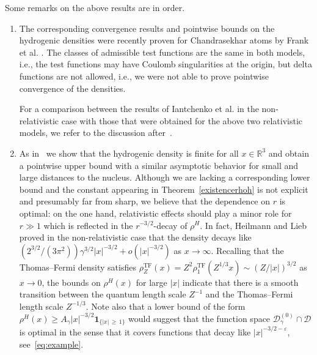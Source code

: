 \documentclass[10pt]{amsart}
\theoremstyle{definition}
\newcommand{\TF}{\mathrm{TF}}
\newcommand*\rz{\mathbb{R}}
\newcommand{\one}{\mathbf{1}}
\newcommand*\cD{\mathcal{D}}
\begin{document}
Some remarks on the above results are in order.

\begin{enumerate}
\item The corresponding convergence results and pointwise bounds on the hydrogenic densities were recently proven for Chandrasekhar atoms by Frank et al. \cite{Franketal2020P}. The classes of admissible test functions are the same in both models, i.e., the test functions may have Coulomb singularities at the origin, but delta functions are not allowed, i.e., we were not able to prove pointwise convergence of the densities.

For a comparison between the results of Iantchenko et al. \cite{Iantchenkoetal1996} in the non-relativistic case with those that were obtained for the above two relativistic models, we refer to the discussion after~\cite[Theorem~1.2]{Franketal2020P}.


\item As in~\cite{Franketal2020P} we show that the hydrogenic density is finite for all $x\in\rz^3$ and obtain a pointwise upper bound with a similar asymptotic behavior for small and large distances to the nucleus. Although we are lacking a corresponding lower bound and the constant appearing in Theorem~\ref{existencerhoh} is not explicit and presumably far from sharp, we believe that the dependence on $r$ is optimal: on the one hand, relativistic effects should play a minor role for $r\gg1$ which is reflected in the $r^{-3/2}$-decay of $\rho^H$. In fact, Heilmann and Lieb~\cite{HeilmannLieb1995} proved in the non-relativistic case that the density decays like $(2^{3/2}/(3\pi^2))\gamma^{3/2}|x|^{-3/2}+o(|x|^{-3/2})$ as $x\to\infty$. Recalling that the Thomas--Fermi density satisfies $\rho_Z^{\TF}(x)=Z^2\rho_1^{\TF}(Z^{1/3}x)\sim(Z/|x|)^{3/2}$ as $x\to0$, the bounds on $\rho^H(x)$ for large $|x|$ indicate that there is a smooth transition between the quantum length scale $Z^{-1}$ and the Thomas--Fermi length scale $Z^{-1/3}$. Note also that a lower bound of the form $\rho^H(x)\geq A_\gamma |x|^{-3/2}\one_{\{|x|\,\geq\,1\}}$ would suggest that the function space $\cD_\gamma^{(0)}\cap\cD$ is optimal in the sense that it covers functions that decay like $|x|^{-3/2-\varepsilon}$, see~\eqref{eq:example}.


\end{enumerate}
\end{document}
